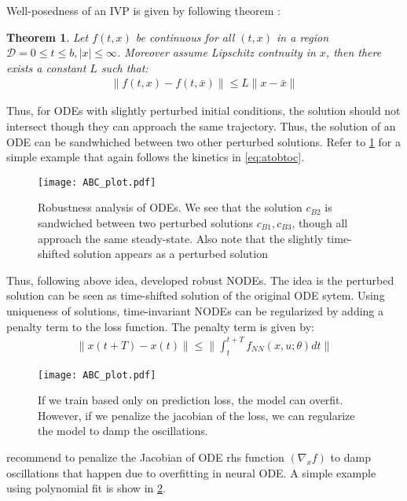 \documentclass[fontsize=11pt]{article}
\newcommand{\norm}[1]{\lVert #1 \rVert}
\newtheorem{theorem}{Theorem}
\theoremstyle{definition}
\begin{document}
Well-posedness of an IVP is given by following theorem \citep{ascher:petzold:1998}:
\begin{theorem}
    Let $f(t,x)$ be continuous for all $(t,x)$ in a region $\mathcal{D} = {0 \leq t \leq b, |x| \leq \infty}$. 
    Moreover assume Lipschitz contnuity in $x$, then there exists a constant $L$ such that:
    \begin{align*}
        \norm{f(t,x) - f(t,\bar{x})} \leq L \norm{x-\bar{x}}
    \end{align*}   
\end{theorem}
Thus, for ODEs with slightly perturbed initial conditions, the solution should not
intersect though they can approach the same trajectory. Thus, the solution of an 
ODE can be sandwhiched between two other perturbed solutions. Refer to \cref{fig:robust} for
a simple example that again follows the kinetics in \cref{eq:atobtoc}.
\begin{figure}[h]
    \centering
    \texttt{[image: ABC\_plot.pdf]} 
    \caption{Robustness analysis of ODEs. We see that the solution $c_{B2}$ 
    is sandwiched between two perturbed solutions $c_{B1}, c_{B3}$, 
    though all approach the same steady-state. Also note that the slightly time-shifted
    solution appears as a perturbed solution}
    \label{fig:robust}
\end{figure}
Thus, following above idea, \cite{yan:du:tan:feng:2019} developed robust NODEs.
The idea is the perturbed solution can be seen as time-shifted solution of the
original ODE sytem. Using uniqueness of solutions, time-invariant NODEs can be regularized by
adding a penalty term to the loss function. The penalty term is given by:
\begin{align*}
    \norm{x(t+T)-x(t)} \leq \norm{\int_t^{t+T} f_{NN}(x, u; \theta) dt}
\end{align*} 

\begin{figure}[h]
    \centering
    \texttt{[image: ABC\_plot.pdf]} 
    \caption{If we train based only on prediction loss, the model can overfit.
    However, if we penalize the jacobian of the loss, we can regularize the model
    to damp the oscillations.}
    \label{fig:jacobnode}
\end{figure}

\cite{finlay:jacobsen:nurbekyan:oberman:2020} recommend to penalize the Jacobian of ODE rhs function
$(\nabla_x f)$ to damp oscillations that happen due to overfitting in neural ODE. A simple example
using polynomial fit is show in \cref{fig:jacobnode}.
\end{document}
